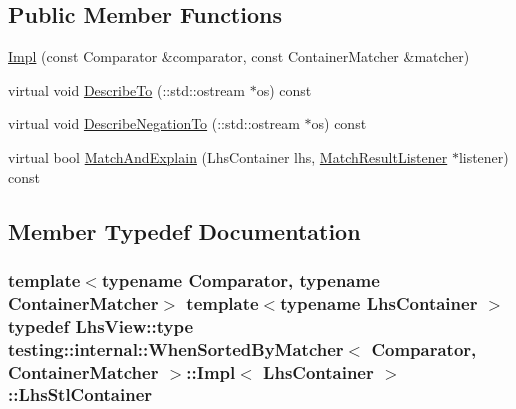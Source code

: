 \subsection*{Public Member Functions}
\begin{DoxyCompactItemize}
\item 
\hyperlink{classtesting_1_1internal_1_1WhenSortedByMatcher_1_1Impl_a63235e98dec5478b7ff9d06f6babc716}{Impl} (const Comparator \&comparator, const Container\+Matcher \&matcher)
\item 
virtual void \hyperlink{classtesting_1_1internal_1_1WhenSortedByMatcher_1_1Impl_a1550eab3f77ff48b54d7a0d33a9d8f31}{Describe\+To} (\+::std\+::ostream $\ast$os) const 
\item 
virtual void \hyperlink{classtesting_1_1internal_1_1WhenSortedByMatcher_1_1Impl_af484d525e5dc6c3ba48c57f0c3696b54}{Describe\+Negation\+To} (\+::std\+::ostream $\ast$os) const 
\item 
virtual bool \hyperlink{classtesting_1_1internal_1_1WhenSortedByMatcher_1_1Impl_af63d23e035f9938be00fb3bb56977ee6}{Match\+And\+Explain} (Lhs\+Container lhs, \hyperlink{classtesting_1_1MatchResultListener}{Match\+Result\+Listener} $\ast$listener) const 
\end{DoxyCompactItemize}


\subsection{Member Typedef Documentation}
\subsubsection[{\texorpdfstring{Lhs\+Stl\+Container}{LhsStlContainer}}]{\setlength{\rightskip}{0pt plus 5cm}template$<$typename Comparator, typename Container\+Matcher$>$ template$<$typename Lhs\+Container $>$ typedef {\bf Lhs\+View\+::type} {\bf testing\+::internal\+::\+When\+Sorted\+By\+Matcher}$<$ Comparator, Container\+Matcher $>$\+::{\bf Impl}$<$ Lhs\+Container $>$\+::{\bf Lhs\+Stl\+Container}}\hypertarget{classtesting_1_1internal_1_1WhenSortedByMatcher_1_1Impl_a2cb1a8d85ca2c376b6abdbcb00d84759}{}\label{classtesting_1_1internal_1_1WhenSortedByMatcher_1_1Impl_a2cb1a8d85ca2c376b6abdbcb00d84759}
